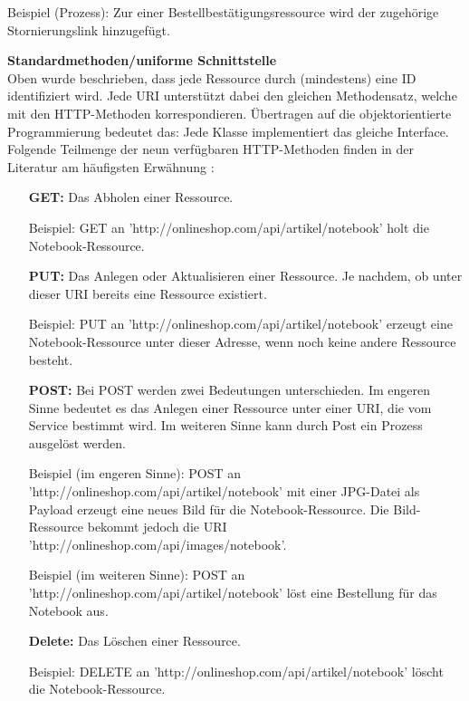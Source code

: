 \documentclass[11pt, a4paper, titlepage, listof=totoc, bibliography=totoc, index=totoc, twoside, openright, headings=normal, draft]{scrreprt}
\begin{document}
Beispiel (Prozess): Zur einer Bestellbestätigungsressource wird der zugehörige Stornierungslink hinzugefügt.

\textbf{Standardmethoden/uniforme Schnittstelle}\\
Oben wurde beschrieben, dass jede Ressource durch (mindestens) eine ID identifiziert wird. Jede URI unterstützt dabei den gleichen Methodensatz, welche mit den HTTP-Methoden korrespondieren. Übertragen auf die objektorientierte Programmierung bedeutet das: Jede Klasse implementiert das gleiche Interface. Folgende Teilmenge der neun verfügbaren HTTP-Methoden finden in der Literatur am häufigsten Erwähnung \citep{richardson07, tilkov11, wilde11}:
\begin{enumerate}[a.]
\item [\textbf{GET:}] Das Abholen einer Ressource.\vspace{0.2em}

Beispiel: GET an 'http://onlineshop.com/api/artikel/notebook' holt die Notebook-Ressource.
\item [\textbf{PUT:}] Das Anlegen oder Aktualisieren einer Ressource. Je nachdem, ob unter dieser URI bereits eine Ressource existiert.\vspace{0.2em}

Beispiel: PUT an 'http://onlineshop.com/api/artikel/notebook' erzeugt eine Notebook-Ressource unter dieser Adresse, wenn noch keine andere Ressource besteht.
\item [\textbf{POST:}] Bei POST werden zwei Bedeutungen unterschieden. Im engeren Sinne bedeutet es das Anlegen einer Ressource unter einer URI, die vom Service bestimmt wird. Im weiteren Sinne kann durch Post ein Prozess ausgelöst werden.\vspace{0.2em}

Beispiel (im engeren Sinne): POST an 'http://onlineshop.com/api/artikel/notebook' mit einer JPG-Datei als Payload erzeugt eine neues Bild für die Notebook-Ressource. Die Bild-Ressource bekommt jedoch die URI 'http://onlineshop.com/api/images/notebook'.

Beispiel (im weiteren Sinne): POST an 'http://onlineshop.com/api/artikel/notebook' löst eine Bestellung für das Notebook aus.
\item [\textbf{Delete:}] Das Löschen einer Ressource.\vspace{0.2em}

Beispiel: DELETE an 'http://onlineshop.com/api/artikel/notebook' löscht die Notebook-Ressource.
\end{enumerate}
\end{document}
